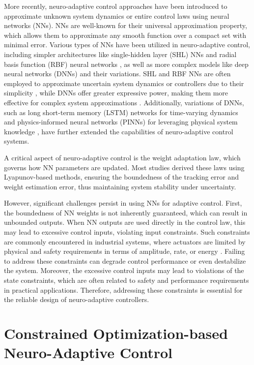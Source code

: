 \documentclass[letterpaper, 10 pt, conference]{ieeeconf}  %
\begin{document}
More recently, neuro-adaptive control approaches have been introduced to approximate unknown system dynamics or entire control laws using neural networks (NNs). 
NNs are well-known for their universal approximation property, which allows them to approximate any smooth function over a compact set with minimal error. 
Various types of NNs have been utilized in neuro-adaptive control, including simpler architectures like single-hidden layer (SHL) NNs \cite{Ge:2010aa} and radial basis function (RBF) neural networks \cite{Liu:2013ab}, as well as more complex models like deep neural networks (DNNs) \cite{Patil:2022aa} and their variations. 
SHL and RBF NNs are often employed to approximate uncertain system dynamics or controllers due to their simplicity \cite{Esfandiari:2015aa}, while DNNs offer greater expressive power, making them more effective for complex system approximations \cite{Rolnick:2018aa}. 
Additionally, variations of DNNs, such as long short-term memory (LSTM) networks for time-varying dynamics \cite{Liu:2013ab} and physics-informed neural networks (PINNs) for leveraging physical system knowledge \cite{Hart:2024aa}, have further extended the capabilities of neuro-adaptive control systems.

A critical aspect of neuro-adaptive control is the weight adaptation law, which governs how NN parameters are updated. 
Most studies derived these laws using Lyapunov-based methods, ensuring the boundedness of the tracking error and weight estimation error, thus maintaining system stability under uncertainty.

However, significant challenges persist in using NNs for adaptive control. 
First, the boundedness of NN weights is not inherently guaranteed, which can result in unbounded outputs. 
When NN outputs are used directly in the control law, this may lead to excessive control inputs, violating input constraints. 
Such constraints are commonly encountered in industrial systems, where actuators are limited by physical and safety requirements in terms of amplitude, rate, or energy \cite{Esfandiari:2021aa}. 
Failing to address these constraints can degrade control performance or even destabilize the system.
Moreover, the excessive control inputs may lead to violations of the state constraints, which are often related to safety and performance requirements in practical applications.
Therefore, addressing these constraints is essential for the reliable design of neuro-adaptive controllers. 

\section{Constrained Optimization-based Neuro-Adaptive Control}
\end{document}
